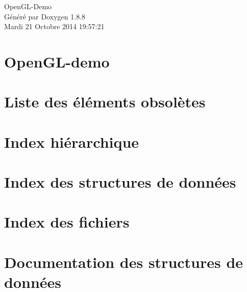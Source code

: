 \documentclass[twoside]{book}
\newcommand{\+}{\discretionary{\mbox{\scriptsize$\hookleftarrow$}}{}{}}
\newcommand{\clearemptydoublepage}{%
  \newpage{\pagestyle{empty}\cleardoublepage}%
}
\begin{document}
\hypersetup{pageanchor=false,
             bookmarks=true,
             bookmarksnumbered=true,
             pdfencoding=unicode
            }
\begin{titlepage}
\vspace*{7cm}
\begin{center}%
{\Large Open\+G\+L-\/\+Demo }\\
\vspace*{1cm}
{\large Généré par Doxygen 1.8.8}\\
\vspace*{0.5cm}
{\small Mardi 21 Octobre 2014 19:57:21}\\
\end{center}
\end{titlepage}
\clearemptydoublepage
\tableofcontents
\clearemptydoublepage
{}
\hypersetup{pageanchor=true}

\chapter{Open\+G\+L-\/demo}
\label{index}\hypertarget{index}{}
\chapter{Liste des éléments obsolètes}
\label{deprecated}
\hypertarget{deprecated}{}

\chapter{Index hiérarchique}

\chapter{Index des structures de données}

\chapter{Index des fichiers}

\chapter{Documentation des structures de données}
























\end{document}
